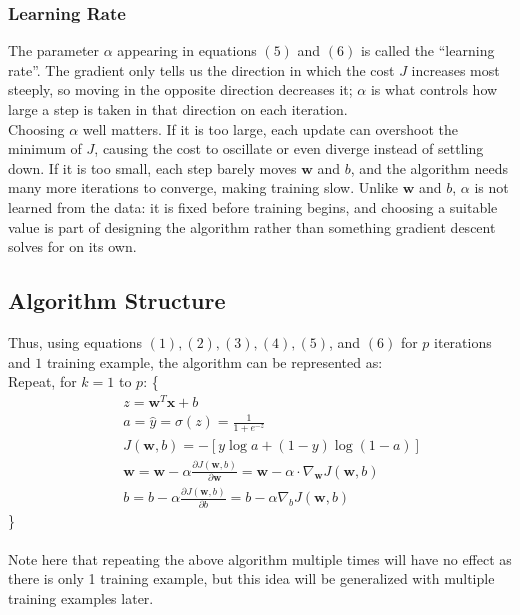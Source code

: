 \documentclass{article}
\begin{document}
\subsubsection{Learning Rate}
The parameter $\alpha$ appearing in equations $(5)$ and $(6)$ is called the ``learning rate''. The gradient only tells us the direction in which the cost $J$ increases most steeply, so moving in the opposite direction decreases it; $\alpha$ is what controls how large a step is taken in that direction on each iteration.
\\
Choosing $\alpha$ well matters. If it is too large, each update can overshoot the minimum of $J$, causing the cost to oscillate or even diverge instead of settling down. If it is too small, each step barely moves $\mathbf{w}$ and $b$, and the algorithm needs many more iterations to converge, making training slow. Unlike $\mathbf{w}$ and $b$, $\alpha$ is not learned from the data: it is fixed before training begins, and choosing a suitable value is part of designing the algorithm rather than something gradient descent solves for on its own.

\subsection{Algorithm Structure}

Thus, using equations $(1), (2), (3), (4), (5)$, and $(6)$ for $p$ iterations and $1$ training example, the algorithm can be represented as:\\
Repeat, for $k=1$ to $p$: \{
\begin{align*}
    &\quad z = \mathbf{w}^T\mathbf{x}+b \\
    &\quad a = \hat{y}=\sigma(z) = \frac{1}{1 + e^{-z}} \\
    &\quad J(\mathbf{w},b)= -[y\log a + (1-y)\log{(1-a)}] \\
    &\quad \mathbf{w} = \mathbf{w} - \alpha \frac{\partial J(\mathbf{w}, b)}{\partial \mathbf{w}} = \mathbf{w} - \alpha \cdot \nabla_\mathbf{w}J(\mathbf{w}, b) \\
    &\quad b=b-\alpha \frac{\partial J(\mathbf{w}, b)}{\partial b}=b-\alpha \nabla_{b}J(\mathbf{w},b)
\end{align*}
\}
\\
\\
Note here that repeating the above algorithm multiple times will have no effect as there is only 1 training example, but this idea will be generalized with multiple training examples later.
\end{document}
